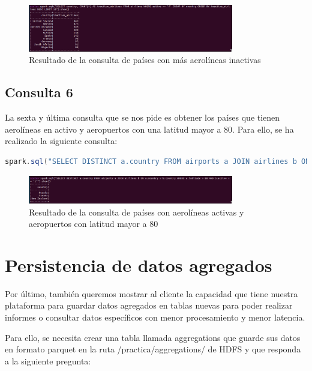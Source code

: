 \begin{figure}[H]
    \centering
    \includegraphics[width=0.8\textwidth]{figures/64.png}
    \caption{Resultado de la consulta de países con más aerolíneas inactivas}
    \label{fig:consulta5}
\end{figure}

\subsection{Consulta 6}

La sexta y última consulta que se nos pide es obtener los países que tienen aerolíneas en activo y aeropuertos con una latitud mayor a 80. Para ello, se ha realizado la siguiente consulta:

\begin{lstlisting}[language=scala]
spark.sql("SELECT DISTINCT a.country FROM airports a JOIN airlines b ON a.country = b.country WHERE a.latitude > 80 AND b.active == 't'").show()
\end{lstlisting}

\begin{figure}[H]
    \centering
    \includegraphics[width=0.8\textwidth]{figures/65.png}
    \caption{Resultado de la consulta de países con aerolíneas activas y aeropuertos con latitud mayor a 80}
    \label{fig:consulta6}
\end{figure}

\section{Persistencia de datos agregados}

Por último, también queremos mostrar al cliente la capacidad que tiene nuestra plataforma para guardar datos agregados en tablas nuevas para poder realizar informes o consultar datos específicos con menor procesamiento y menor latencia. 

Para ello, se necesita crear una tabla llamada aggregations que guarde sus datos en formato
parquet en la ruta /practica/aggregations/ de HDFS y que responda a la siguiente pregunta:

